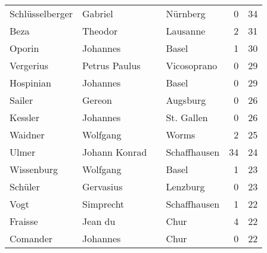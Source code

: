 \begin{tabular}{llllrr}
          Schlüsselberger &                            Gabriel &             &                                    Nürnberg &          0 &        34 \\
                     Beza &                            Theodor &             &                                    Lausanne &          2 &        31 \\
                   Oporin &                           Johannes &             &                                       Basel &          1 &        30 \\
                Vergerius &                      Petrus Paulus &             &                                 Vicosoprano &          0 &        29 \\
                Hospinian &                           Johannes &             &                                       Basel &          0 &        29 \\
                   Sailer &                             Gereon &             &                                    Augsburg &          0 &        26 \\
                  Kessler &                           Johannes &             &                                  St. Gallen &          0 &        26 \\
                  Waidner &                           Wolfgang &             &                                       Worms &          2 &        25 \\
                    Ulmer &                      Johann Konrad &             &                                Schaffhausen &         34 &        24 \\
               Wissenburg &                           Wolfgang &             &                                       Basel &          1 &        23 \\
                  Schüler &                          Gervasius &             &                                    Lenzburg &          0 &        23 \\
                     Vogt &                          Simprecht &             &                                Schaffhausen &          1 &        22 \\
                  Fraisse &                            Jean du &             &                                        Chur &          4 &        22 \\
                 Comander &                           Johannes &             &                                        Chur &          0 &        22 \\

\end{tabular}
